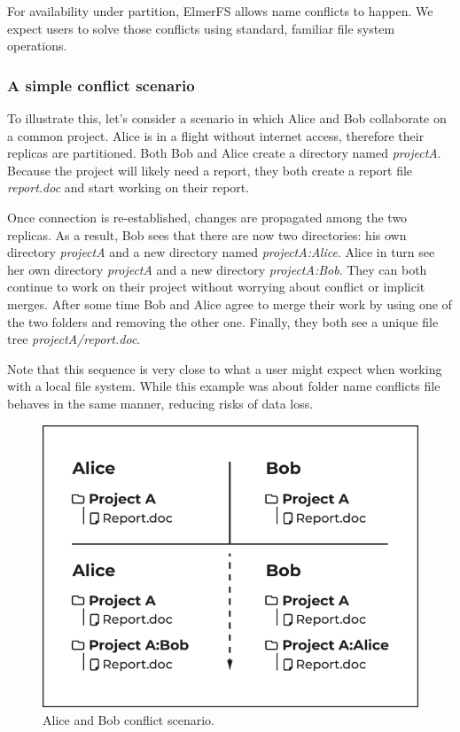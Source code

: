 \documentclass[sigconf, anonymous, 10pt]{acmart}
\begin{document}
For availability under partition, ElmerFS allows name conflicts to happen. We expect users to solve
those conflicts using standard, familiar file system operations.

\subsubsection{A simple conflict scenario}
To illustrate this, let's consider a scenario in which Alice and Bob collaborate
on a common project.
Alice is in a flight without internet access, therefore their replicas are
partitioned.
Both Bob and Alice create a directory named \textit{projectA}.
Because the project will likely need a report,
they both create a report file \textit{report.doc} and start working on their
report.

Once connection is re-established, changes are propagated among the two replicas.
As a result, Bob sees that there are now two directories:
his own directory \textit{projectA} and a new directory named \textit{projectA:Alice}.
Alice in turn see her own directory \textit{projectA} and a new directory \textit{projectA:Bob}.
They can both continue to work on their project without worrying about
conflict or implicit merges. After some time Bob and Alice agree to merge
their work by using one of the two folders and removing the other one.
Finally, they both see a unique file tree \textit{projectA/report.doc}.

Note that this sequence is very close to what a user might expect when working with a local file system. While this example was about folder name conflicts file behaves in the same manner, reducing risks of data loss.

\begin{figure}[h]
	\caption{Alice and Bob conflict scenario.}
	\centering
	\includegraphics[scale=0.5]{AliceBob-font-des-fichiers.pdf}
\end{figure}
\end{document}

